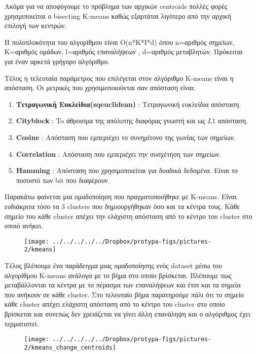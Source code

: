Ακόμα για να αποφύγουμε το πρόβλημα των αρχικών centroids πολλές φορές χρησμιποιείται ο bisecting K-means καθώς εξαρτάται λιγότερο από την αρχική επιλογή των κεντρών.

Η πολυπλοκότητα του αλγορίθμου είναι Ο(n*K*I*d) όπου n=αριθμός σημείων, Κ=αριθμός ομάδων, l=αριθμός επαναλήψεων , d=αριθμός μεταβλητών. Πρόκειται για έναν αρκετά γρήγορο αλγόριθμο.

Τέλος η τελευταία παράμετρος που επιλέγεται στον αλγόριθμο K-means είναι η απόσταση. Οι μετρικές που χρησιμοποιούνται σαν απόσταση είναι:
\begin{enumerate}
	\item \textbf{Τετραγωνική Ευκλείδια(sqeuclidean) }: Τετραγωνική ευκλείδια απόσταση.
	\item \textbf{Cityblock }: To άθροισμα της απόλυτης διαφόρας γνωστή και ως $L1$ απόσταση.
	\item \textbf{Cosine }: Απόσταση που εμπεριέχει το συνημίτονο της γωνίας των σημείων.
	\item \textbf{Correlation }: Απόσταση που εμπεριέχει την συσχέτηση των σημείων.
	\item \textbf{Hamming }: Απόσταση που χρησιμοποιείται για δυαδικά δεδομένα. Είναι το ποσοστό των bit που διαφέρουν.
\end{enumerate}

Παρακάτω φαίνεται μια ομαδοποίηση που πραγματοποιήθηκε με K-means. Είναι ευδιάκριτα τόσο τα 3 clusters που δημιουργήθηκαν όσο και τα κέντρα τους. Κάθε σημείο του κάθε cluster απέχει την ελάχιστη απόσταση από το κέντρο του cluster στο οποιό ανήκει.

	\begin{figure}
\centering
\texttt{[image: ../../../../../Dropbox/protypa-figs/pictures-2/kmeans]}
\caption{}
\label{fig:kmeans}
\end{figure}


Τέλος βλέπουμε ένα παράδειγμα μιας ομαδοποίησης ενός dataset μέσω του αλγορίθμου K-means ανάλογα με το βήμα στο οποίο βρίσκεται. Βλέπουμε πως μεταβάλλονται τα κέντρα με το πέρασμα των επαναλήψεων και έτσι και τα σημεία που ανήκουν σε κάθε cluster. Στο τελευταίο βήμα παρατηρούμε πάλι ότι το σημείο κάθε cluster απέχει ελάχιστη απόσταση από το κέντρο του cluster στο οποίο βρίσκεται και συνεπώς δεν χρειάζεται να γίνει άλλη επανάληψη και ο αλγόριθμος έχει τερματιστεί.

\begin{figure}
\centering
\texttt{[image: ../../../../../Dropbox/protypa-figs/pictures-2/kmeans\_change\_centroids]}
\caption{}
\label{fig:kmeans_change_centroids}
\end{figure}



